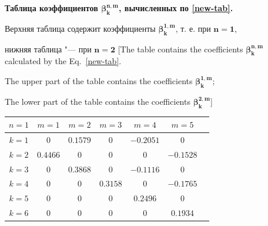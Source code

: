 \begin{table}[h]

\begin{center}

\begin{minipage}{.8\textwidth}

\hypertarget{tabl:new}{}

 \small

 {\bf Таблица коэффициентов $\boldsymbol{\beta_k^{n,m}}$, вычисленных по \eqref{new-tab}. 

Верхняя таблица содержит коэффициенты $\boldsymbol{\beta_k^{1,m}}$, т. е. при $\boldsymbol{n=1}$,

 нижняя таблица "--- при $\boldsymbol{n=2}$ [The table contains the coefficients $\boldsymbol{\beta_k^{n,m}}$ calculated by the Eq.~\eqref{new-tab}.

The upper part of the table contains the coefficients $\boldsymbol{\beta_k^{1,m}}$; 

\centerline{The lower part of the table contains the coefficients $\boldsymbol{\beta_k^{2,m}}$]} }

 

\centering

\begin{tabular}{|c||c|c|c|c|c|c|}

\hline

$n=1$ & $m=1$ & $m=2$ & $m=3$ & $m=4$ & $m=5$  \\

\hline

\hline

$k=1$ & $0$ & $0.1579$ & $0$ & $-0.2051$ & $0$\\

\hline

$k=2$ & $0.4466$ & $0$ & $0$ & $0$ & $-0.1528$\\

\hline

$k=3$ & $0$ & $0.3868$ & $0$ & $-0.1116$ & $0$\\

\hline

$k=4$ & $0$ & $0$ & $0.3158$ & $0$ & $-0.1765$\\

\hline

$k=5$ & $0$ & $0$ & $0$ & $0.2496$ & $0$\\

\hline

$k=6$ & $0$ & $0$ & $0$ & $0$ & $0.1934$\\


\end{tabular}
\end{minipage}
\end{center}
\end{table}
